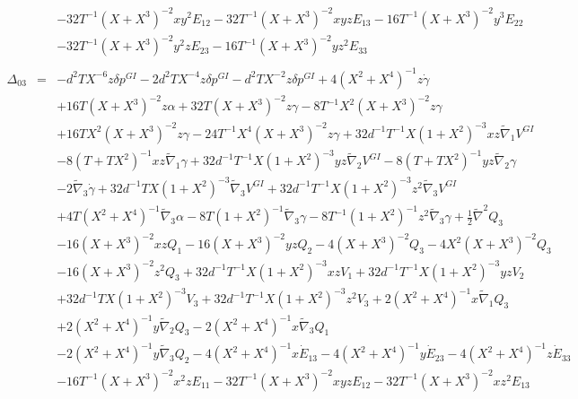 \documentclass[10pt,letterpaper]{article}
\numberwithin{equation}{section}
\begin{document}
\begin{eqnarray}
&& - 32 T^{-1} (X + X^3)^{-2} x y^2 E_{12} - 32 T^{-1} (X + X^3)^{-2} x y z E_{13} - 16 T^{-1} (X + X^3)^{-2} y^3 E_{22} \nonumber \\ 
&& - 32 T^{-1} (X + X^3)^{-2} y^2 z E_{23} - 16 T^{-1} (X + X^3)^{-2} y z^2 E_{33}
\\  \nonumber\\ 
\Delta_{03}&=& - d^2 T X^{-6} z \delta p^{GI}{} - 2 d^2 T X^{-4} z \delta p^{GI}{} -  d^2 T X^{-2} z \delta p^{GI}{} + 4 (X^2 + X^4)^{-1} z \dot{\gamma} \nonumber \\ 
&& + 16 T (X + X^3)^{-2} z \alpha + 32 T (X + X^3)^{-2} z \gamma - 8 T^{-1} X^2 (X + X^3)^{-2} z \gamma \nonumber \\ 
&& + 16 T X^2 (X + X^3)^{-2} z \gamma - 24 T^{-1} X^4 (X + X^3)^{-2} z \gamma + 32 d^{-1} T^{-1} X (1 + X^2)^{-3} x z \tilde{\nabla}_{1}V^{GI}{} \nonumber \\ 
&& - 8 (T + T X^2)^{-1} x z \tilde{\nabla}_{1}\gamma + 32 d^{-1} T^{-1} X (1 + X^2)^{-3} y z \tilde{\nabla}_{2}V^{GI}{} - 8 (T + T X^2)^{-1} y z \tilde{\nabla}_{2}\gamma \nonumber \\ 
&& - 2 \tilde{\nabla}_{3}\dot{\gamma} + 32 d^{-1} T X (1 + X^2)^{-3} \tilde{\nabla}_{3}V^{GI}{} + 32 d^{-1} T^{-1} X (1 + X^2)^{-3} z^2 \tilde{\nabla}_{3}V^{GI}{} \nonumber \\ 
&& + 4 T (X^2 + X^4)^{-1} \tilde{\nabla}_{3}\alpha - 8 T (1 + X^2)^{-1} \tilde{\nabla}_{3}\gamma - 8 T^{-1} (1 + X^2)^{-1} z^2 \tilde{\nabla}_{3}\gamma +\tfrac{1}{2} \tilde{\nabla}^{2}Q_{3} \nonumber \\ 
&& - 16 (X + X^3)^{-2} x z Q_{1} - 16 (X + X^3)^{-2} y z Q_{2} - 4 (X + X^3)^{-2} Q_{3} - 4 X^2 (X + X^3)^{-2} Q_{3} \nonumber \\ 
&& - 16 (X + X^3)^{-2} z^2 Q_{3} + 32 d^{-1} T^{-1} X (1 + X^2)^{-3} x z V_{1} + 32 d^{-1} T^{-1} X (1 + X^2)^{-3} y z V_{2} \nonumber \\ 
&& + 32 d^{-1} T X (1 + X^2)^{-3} V_{3} + 32 d^{-1} T^{-1} X (1 + X^2)^{-3} z^2 V_{3} + 2 (X^2 + X^4)^{-1} x \tilde{\nabla}_{1}Q_{3} \nonumber \\ 
&& + 2 (X^2 + X^4)^{-1} y \tilde{\nabla}_{2}Q_{3} - 2 (X^2 + X^4)^{-1} x \tilde{\nabla}_{3}Q_{1} \nonumber \\ 
&& - 2 (X^2 + X^4)^{-1} y \tilde{\nabla}_{3}Q_{2}-4 (X^2 + X^4)^{-1} x \dot{E}_{13} - 4 (X^2 + X^4)^{-1} y \dot{E}_{23} - 4 (X^2 + X^4)^{-1} z \dot{E}_{33} \nonumber \\ 
&& - 16 T^{-1} (X + X^3)^{-2} x^2 z E_{11} - 32 T^{-1} (X + X^3)^{-2} x y z E_{12} - 32 T^{-1} (X + X^3)^{-2} x z^2 E_{13} \nonumber \\ 

\end{eqnarray}
\end{document}
